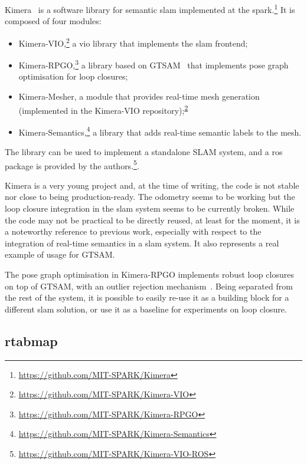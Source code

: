 \documentclass[11pt, letterpaper, twoside]{article}
\begin{document}
Kimera~\cite{rosinol2019kimera} is a software library for semantic \gls{slam}
implemented at the
\gls{spark}.\footnote{\url{https://github.com/MIT-SPARK/Kimera}} It is composed
of four modules:
\begin{itemize}
    \item
        Kimera-VIO,\footnote{\label{note:kimera_vio}\url{https://github.com/MIT-SPARK/Kimera-VIO}} a
        \gls{vio} library that implements the \gls{slam} frontend;
    \item
        Kimera-RPGO,\footnote{\url{https://github.com/MIT-SPARK/Kimera-RPGO}}
        a library based on GTSAM~\cite{dellaert2006square,dellaert2012factor}
        that implements pose graph optimisation for loop closures;
    \item
        Kimera-Mesher, a module that provides real-time mesh generation
        (implemented in the Kimera-VIO
        repository);\textsuperscript{\ref{note:kimera_vio}}
    \item
        Kimera-Semantics,\footnote{\url{https://github.com/MIT-SPARK/Kimera-Semantics}}
        a library that adds real-time semantic labels to the mesh.
\end{itemize}

The library can be used to implement a standalone SLAM system, and a \gls{ros}
package is provided by the
authors.\footnote{\url{https://github.com/MIT-SPARK/Kimera-VIO-ROS}}.

Kimera is a very young project and, at the time of writing, the code is not
stable nor close to being production-ready. The odometry seems to be working
but the loop closure integration in the \gls{slam} system seems to be currently
broken. While the code may not be practical to be directly reused, at least for
the moment, it is a noteworthy reference to previous work, especially with
respect to the integration of real-time semantics in a \gls{slam} system. It
also represents a real example of usage for GTSAM.

The pose graph optimisation in Kimera-RPGO implements robust loop closures on
top of GTSAM, with an outlier rejection mechanism~\cite{mangelson2018pairwise}.
Being separated from the rest of the system, it is possible to easily re-use it
as a building block for a different \gls{slam} solution, or use it as a
baseline for experiments on loop closure.

\subsection{\acs{rtabmap}}
\end{document}
